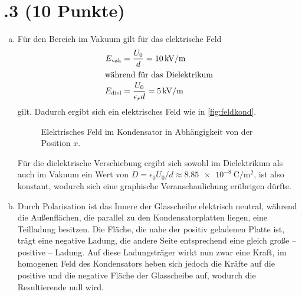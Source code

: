 \section*{\nr.3 \titthree (10 Punkte)}
\begin{enumerate}[(a)]
\item Für den Bereich im Vakuum gilt für das elektrische Feld
\begin{align}
E_\text{vak} &= \frac{U_0}{d} = \SI{10}{\kilo\volt\per\meter}\\
\intertext{während für das Dielektrikum}
E_\text{diel} &= \frac{U_0}{\epsilon_r d} = \SI{5}{\kilo\volt\per\meter}
\end{align}
gilt. Dadurch ergibt sich ein elektrisches Feld wie in \vref{fig:feldkond}.

\begin{figure}[htbp]
\centering
{}
\caption{Elektrisches Feld im Kondensator in Abhängigkeit von der Position $x$.}
\label{fig:feldkond}
\end{figure}

Für die dielektrische Verschiebung ergibt sich sowohl im Dielektrikum als auch im Vakuum ein Wert von $D=\epsilon_0 U_0/d\approx \SI{8.85e-8}{\coulomb\per\meter\squared}$, ist also konstant, wodurch sich eine graphische Veranschaulichung erübrigen dürfte.
\item 
Durch Polarisation ist das Innere der Glasscheibe elektrisch neutral, während die Außenflächen, die parallel zu den Kondensatorplatten liegen, eine Teilladung besitzen. Die Fläche, die nahe der positiv geladenen Platte ist, trägt eine negative Ladung, die andere Seite entsprechend eine gleich große -- positive -- Ladung. Auf diese Ladungsträger wirkt nun zwar eine Kraft, im homogenen Feld des Kondensators heben sich jedoch die Kräfte auf die positive und die negative Fläche der Glasscheibe auf, wodurch die Resultierende null wird.


\end{enumerate}
